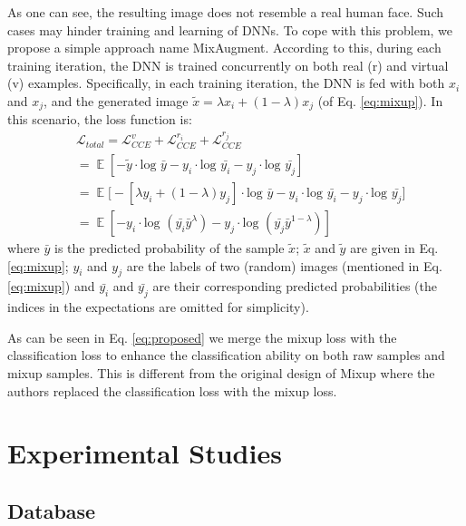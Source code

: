 \documentclass[10pt,twocolumn,letterpaper]{article}
\begin{document}
 As one can see, the resulting image does not resemble a real human face. Such cases may hinder training and learning of DNNs.
To cope with this problem, we propose a simple approach name MixAugment. According to this, during each training iteration, the DNN is trained concurrently on both real (r) and virtual (v) examples. Specifically, in each training iteration, the DNN is fed with both $x_i$ and $x_j$, and the generated image $\tilde{x} = \lambda x_i+(1-\lambda)x_j$ (of Eq. \ref{eq:mixup}). In this scenario, the loss function is: 
\begin{align}
&\mathcal{L}_{total} =  \mathcal{L}_{CCE}^{v} + \mathcal{L}_{CCE}^{r_i} + \mathcal{L}_{CCE}^{r_j} \nonumber   \\
&= \mathop{ \mathbb{E}}[- \tilde{y} \cdot \text{log } \bar{y} - y_i \cdot \text{log } \bar{y_i} - y_j \cdot \text{log } \bar{y_j} ] \nonumber   \\
& = \mathop{ \mathbb{E}} \big [- [\lambda y_i+(1-\lambda)y_j] \cdot \text{log } \bar{y} - y_i \cdot \text{log } \bar{y_i} - y_j \cdot \text{log } \bar{y_j} \big ] \nonumber   \\
&= \mathop{ \mathbb{E}}[- y_i \cdot \text{log } (\bar{y_i} \bar{y}^\lambda) - y_j \cdot \text{log } (\bar{y_j} \bar{y}^{1-\lambda}) ]   \label{eq:proposed}
\end{align}
where  $\bar{y}$  is the predicted probability of the sample $\tilde{x}$; $\tilde{x}$ and $\tilde{y}$ are given in Eq. \ref{eq:mixup}; $y_i$ and $y_j$ are the labels of two (random) images (mentioned in Eq. \ref{eq:mixup}) and $\bar{y_i}$ and $\bar{y_j}$ are their corresponding predicted probabilities (the indices in the expectations are omitted for simplicity).


As can be seen in Eq. \ref{eq:proposed} we merge the mixup loss with the classification loss to enhance the classification ability on both raw samples and mixup samples. This is different from the original design of Mixup \cite{zhang2017mixup} where the authors replaced the classification loss with the mixup loss.






\section{Experimental Studies}


\subsection{Database}
\end{document}
